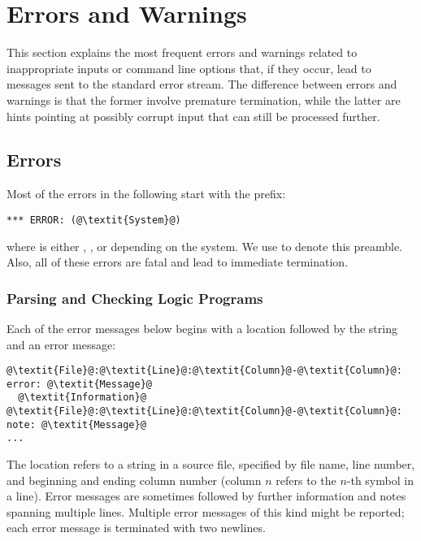 \section{Errors and Warnings}\label{sec:errorwarn}

This section explains the most frequent errors and warnings 
related to inappropriate inputs or command line options that,
if they occur,
lead to messages sent to the standard error stream.
The difference between errors and warnings is that the former involve premature termination,
while the latter are hints pointing at possibly corrupt input that can still be processed further.

\subsection{Errors}\label{sec:error}

Most of the errors in the following start with the prefix:
\begin{lstlisting}[numbers=none,escapechar=@]
*** ERROR: (@\textit{System}@)
\end{lstlisting}
where  is either , , or  depending on the system.
We use  to denote this preamble.
Also, all of these errors are fatal and lead to immediate termination.

\subsubsection{Parsing and Checking Logic Programs}\label{subsec:error:parselp}

Each of the error messages below begins with a location followed by the string  and an error message:
\begin{lstlisting}[numbers=none,escapechar=@]
@\textit{File}@:@\textit{Line}@:@\textit{Column}@-@\textit{Column}@: error: @\textit{Message}@
  @\textit{Information}@
@\textit{File}@:@\textit{Line}@:@\textit{Column}@-@\textit{Column}@: note: @\textit{Message}@
...

\end{lstlisting}
The location refers to a string in a source file, specified by file name, line number, and beginning and ending column number
(column $n$ refers to the $n$-th symbol in a line).
Error messages are sometimes followed by further information and notes spanning multiple lines.
Multiple error messages of this kind might be reported; 
each error message is terminated with two newlines.

